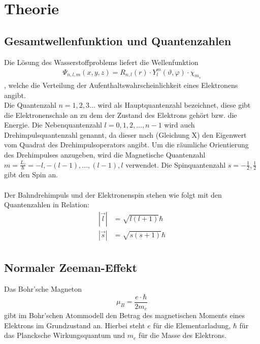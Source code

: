 \section{Theorie}
\label{sec:Theorie}
\subsection{Gesamtwellenfunktion und Quantenzahlen}
Die Lösung des Wasserstoffproblems liefert die Wellenfunktion
\begin{align*}
    \Psi_{n, l, m} (x, y, z) = R_{n, l}(r) \cdot Y_l^m (\vartheta, \varphi) \cdot \chi_{m_s}
\end{align*}
, welche die Verteilung der Aufenthaltswahrscheinlichkeit eines Elektronens angibt.\\
Die Quantenzahl $n = 1, 2, 3 ...$ wird als Hauptquantenzahl bezeichnet, diese gibt die Elektronenschale an zu dem der Zustand des Elektrons gehört bzw. die Energie.
Die Nebenquantenzahl $l = 0, 1, 2, ..., n-1 $ wird auch Drehimpulsquantenzahl genannt, da dieser nach (Gleichung X) den Eigenwert vom Quadrat des Drehimpulsoperators angibt.%
Um die räumliche Orientierung des Drehimpulses anzugeben, wird die Magnetische Quantenzahl $m = \frac{L_z}{\hbar} = -l, - (l-1), ..., (l-1), l$ verwendet.
Die Spinquantenzahl $s = -\frac{1}{2} , \frac{1}{2}$ gibt den Spin an.
\\ \\
Der Bahndrehimpuls und der Elektronenspin stehen wie folgt mit den Quantenzahlen in Relation:
\begin{align}
    |\vec{l}| &= \sqrt{l(l+1)} \hbar \\
    |\vec{s}| &= \sqrt{s(s+1)} \hbar \\
\end{align}

\subsection{Normaler Zeeman-Effekt}
Das Bohr'sche Magneton
\begin{equation}
    \mu_B = \frac{e \cdot \hbar}{2 m_e}
\end{equation}
gibt im Bohr'schen Atommodell den Betrag des magnetischen Moments eines Elektrons im Grundzustand an.
Hierbei steht $e$ für die Elementarladung, $\hbar$ für das Plancksche Wirkungsquantum und $m_e$ für die Masse des Elektrons.